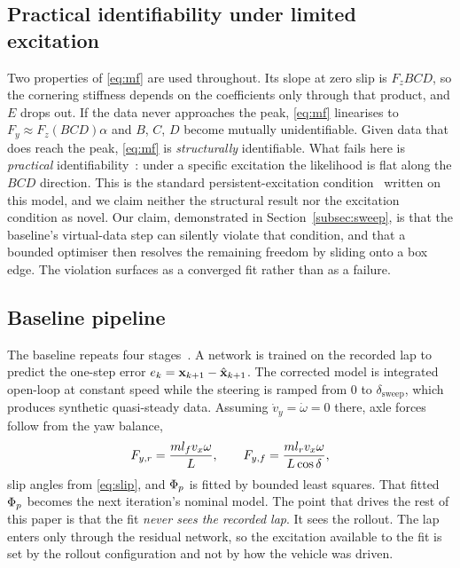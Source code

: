 \subsection{Practical identifiability under limited excitation}
\label{subsec:identifiability}

Two properties of \eqref{eq:mf} are used throughout. Its slope at zero slip is
$F_{z}BCD$, so the cornering stiffness depends on the coefficients only through
that product, and $E$ drops out. If the data never approaches the peak,
\eqref{eq:mf} linearises to $F_{y}\approx F_{z}(BCD)\alpha$ and $B$, $C$, $D$
become mutually unidentifiable. Given data that does reach the peak,
\eqref{eq:mf} is \emph{structurally} identifiable. What fails here is
\emph{practical} identifiability~\cite{raue2009practical}: under a specific
excitation the likelihood is flat along the $BCD$ direction. This is the
standard persistent-excitation condition~\cite{ljung1999sysid} written on this
model, and we claim neither the structural result nor the excitation condition
as novel. Our claim, demonstrated in Section~\ref{subsec:sweep}, is that the
baseline's virtual-data step can silently violate that condition, and that a
bounded optimiser then resolves the remaining freedom by sliding onto a box
edge. The violation surfaces as a converged fit rather than as a failure.

\subsection{Baseline pipeline}
\label{subsec:baseline}

The baseline repeats four stages~\cite{ontrack2025}. A network is trained on
the recorded lap to predict the one-step error
$e_{k}=\mathbf{x}_{k+1}-\hat{\mathbf{x}}_{k+1}$. The corrected model is integrated
open-loop at constant speed while the steering is ramped from $0$ to
$\delta_{\mathrm{sweep}}$, which produces synthetic quasi-steady data.
Assuming $\dot v_{y}=\dot\omega=0$ there, axle forces follow from the yaw
balance,
\begin{equation}
F_{y,r}=\frac{m l_{f}v_{x}\omega}{L},\qquad
F_{y,f}=\frac{m l_{r} v_{x}\omega}{L\cos\delta},
\label{eq:ssforces}
\end{equation}
slip angles from \eqref{eq:slip}, and $\Phi_{p}$ is fitted by bounded least
squares. That fitted $\Phi_{p}$ becomes the next iteration's nominal model.
The point that drives the rest of this paper is that the fit \emph{never sees
the recorded lap}. It sees the rollout. The lap enters only through the
residual network, so the excitation available to the fit is set by the rollout
configuration and not by how the vehicle was driven.
